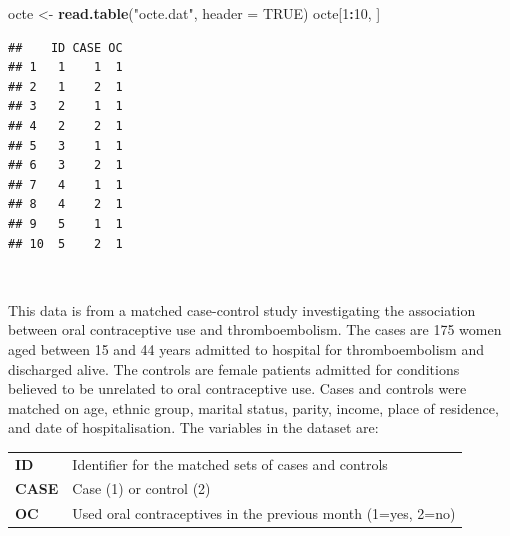 \documentclass[12pt,a4paper]{book}
\newenvironment{Shaded}{\begin{snugshade}}{\end{snugshade}}
\newcommand{\DataTypeTok}[1]{\textcolor[rgb]{0.13,0.29,0.53}{#1}}
\newcommand{\DecValTok}[1]{\textcolor[rgb]{0.00,0.00,0.81}{#1}}
\newcommand{\KeywordTok}[1]{\textcolor[rgb]{0.13,0.29,0.53}{\textbf{#1}}}
\newcommand{\NormalTok}[1]{#1}
\newcommand{\OperatorTok}[1]{\textcolor[rgb]{0.81,0.36,0.00}{\textbf{#1}}}
\newcommand{\OtherTok}[1]{\textcolor[rgb]{0.56,0.35,0.01}{#1}}
\newcommand{\StringTok}[1]{\textcolor[rgb]{0.31,0.60,0.02}{#1}}
\theoremstyle{definition}
\theoremstyle{definition}
\theoremstyle{definition}
\theoremstyle{remark}
\begin{document}
\begin{Shaded}
\begin{Highlighting}[]
\NormalTok{octe <-}\StringTok{ }\KeywordTok{read.table}\NormalTok{(}\StringTok{"octe.dat"}\NormalTok{, }\DataTypeTok{header =} \OtherTok{TRUE}\NormalTok{)}
\NormalTok{octe[}\DecValTok{1}\OperatorTok{:}\DecValTok{10}\NormalTok{, ]}
\end{Highlighting}
\end{Shaded}

\begin{verbatim}
##    ID CASE OC
## 1   1    1  1
## 2   1    2  1
## 3   2    1  1
## 4   2    2  1
## 5   3    1  1
## 6   3    2  1
## 7   4    1  1
## 8   4    2  1
## 9   5    1  1
## 10  5    2  1
\end{verbatim}

~

This data is from a matched case-control study investigating the
association between oral contraceptive use and thromboembolism. The
cases are 175 women aged between 15 and 44 years admitted to hospital
for thromboembolism and discharged alive. The controls are female
patients admitted for conditions believed to be unrelated to oral
contraceptive use. Cases and controls were matched on age, ethnic group,
marital status, parity, income, place of residence, and date of
hospitalisation. The variables in the dataset are:

\newpage

\begin{longtable}[]{@{}ll@{}}
\toprule
\endhead
\begin{minipage}[t]{0.19\columnwidth}\raggedright
\textbf{ID}\strut
\end{minipage} & \begin{minipage}[t]{0.75\columnwidth}\raggedright
Identifier for the matched sets of cases and controls\strut
\end{minipage}\tabularnewline
\begin{minipage}[t]{0.19\columnwidth}\raggedright
\textbf{CASE}\strut
\end{minipage} & \begin{minipage}[t]{0.75\columnwidth}\raggedright
Case (1) or control (2)\strut
\end{minipage}\tabularnewline
\begin{minipage}[t]{0.19\columnwidth}\raggedright
\textbf{OC}\strut
\end{minipage} & \begin{minipage}[t]{0.75\columnwidth}\raggedright
Used oral contraceptives in the previous month (1=yes, 2=no)\strut
\end{minipage}\tabularnewline
\bottomrule
\end{longtable}
\end{document}
